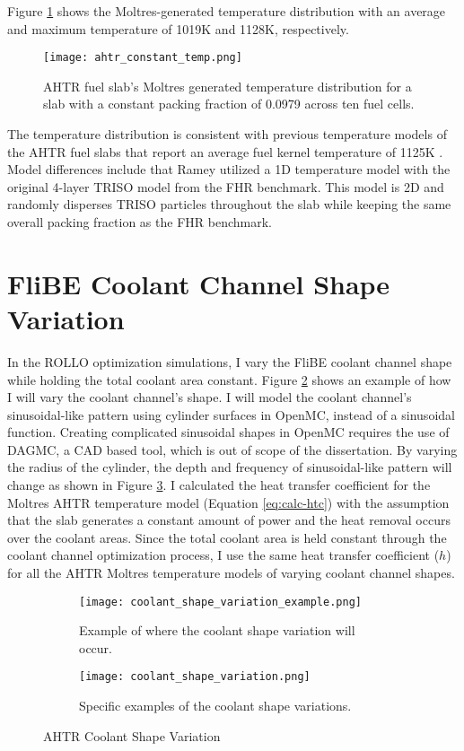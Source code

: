 Figure \ref{fig:ahtr_constant_temp} shows the Moltres-generated temperature 
distribution with an average and maximum temperature of 1019K and 1128K, 
respectively.
\begin{figure}[H]
    \centering
    \texttt{[image: ahtr\_constant\_temp.png]}
    \caption{AHTR fuel slab's Moltres generated temperature distribution for a 
    slab with a constant packing fraction of 0.0979 across ten fuel cells.}  
    \label{fig:ahtr_constant_temp}
\end{figure}
The temperature distribution is consistent with previous temperature models of 
the AHTR fuel slabs that report an average fuel kernel temperature of 1125K 
\cite{ramey_methodology_2021}. 
Model differences include that Ramey \cite{ramey_methodology_2021} utilized a 
1D temperature model with the original 4-layer TRISO model from the FHR benchmark. 
This model is 2D and randomly disperses TRISO particles throughout the 
slab while keeping the same overall packing fraction as the FHR benchmark. 

\pagebreak

\section{FliBE Coolant Channel Shape Variation}
In the ROLLO optimization simulations, I vary the FliBE coolant channel shape 
while holding the total coolant area constant.  
Figure \ref{fig:ahtr-coolant-shape-variation-1} shows an example of how I will 
vary the coolant channel's shape. 
I will model the coolant channel's sinusoidal-like pattern using cylinder 
surfaces in OpenMC, instead of a sinusoidal function. 
Creating complicated sinusoidal shapes in OpenMC requires the use of DAGMC, a 
CAD based tool, which is out of scope of the dissertation.
By varying the radius of the cylinder, the depth and frequency of sinusoidal-like 
pattern will change as shown in Figure \ref{fig:ahtr-coolant-shape-variation-2}. 
I calculated the heat transfer coefficient for the Moltres AHTR temperature model 
(Equation \ref{eq:calc-htc}) with the assumption that the slab generates a 
constant amount of power and the heat removal occurs over the coolant areas.
Since the total coolant area is held constant through the coolant channel 
optimization process, I use the same heat transfer coefficient ($h$)
for all the AHTR Moltres temperature models of varying coolant channel shapes.   
\begin{figure}[H]
    \centering
    \begin{subfigure}{\textwidth}
        \texttt{[image: coolant\_shape\_variation\_example.png]}
        \caption{Example of where the coolant shape variation will occur.}
        \label{fig:ahtr-coolant-shape-variation-1}
    \end{subfigure}
    \begin{subfigure}{\textwidth}
        \texttt{[image: coolant\_shape\_variation.png]}
        \caption{Specific examples of the coolant shape variations.}
        \label{fig:ahtr-coolant-shape-variation-2}
    \end{subfigure}
    \caption{AHTR Coolant Shape Variation}  
    \label{fig:ahtr-coolant-shape-variation}
\end{figure}